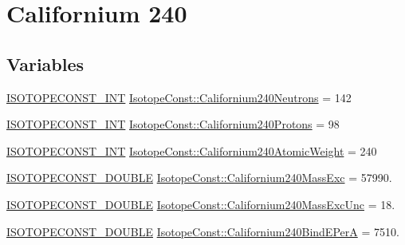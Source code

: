 \hypertarget{group___isotope_const-_californium-_cf240}{}\section{Californium 240}
\label{group___isotope_const-_californium-_cf240}
\subsection*{Variables}
\begin{DoxyCompactItemize}
\item 
\mbox{\hyperlink{group___isotope_const-_macros_ga5f18360b3e99483a35c32d789e62621c}{I\+S\+O\+T\+O\+P\+E\+C\+O\+N\+S\+T\+\_\+\+I\+NT}} \mbox{\hyperlink{group___isotope_const-_californium-_cf240_ga4916f5ae80176eed703cdb8b3a03922d}{Isotope\+Const\+::\+Californium240\+Neutrons}} = 142
\item 
\mbox{\hyperlink{group___isotope_const-_macros_ga5f18360b3e99483a35c32d789e62621c}{I\+S\+O\+T\+O\+P\+E\+C\+O\+N\+S\+T\+\_\+\+I\+NT}} \mbox{\hyperlink{group___isotope_const-_californium-_cf240_ga8d510fe42c47660cd961e486d42815f9}{Isotope\+Const\+::\+Californium240\+Protons}} = 98
\item 
\mbox{\hyperlink{group___isotope_const-_macros_ga5f18360b3e99483a35c32d789e62621c}{I\+S\+O\+T\+O\+P\+E\+C\+O\+N\+S\+T\+\_\+\+I\+NT}} \mbox{\hyperlink{group___isotope_const-_californium-_cf240_ga3d26e5f197b5d6b7f0328f293d7250d6}{Isotope\+Const\+::\+Californium240\+Atomic\+Weight}} = 240
\item 
\mbox{\hyperlink{group___isotope_const-_macros_ga8f45a7272ce02c0b4c65c44636ed719a}{I\+S\+O\+T\+O\+P\+E\+C\+O\+N\+S\+T\+\_\+\+D\+O\+U\+B\+LE}} \mbox{\hyperlink{group___isotope_const-_californium-_cf240_ga1e85418ad4928e6fb75eae97ebea9a02}{Isotope\+Const\+::\+Californium240\+Mass\+Exc}} = 57990.
\item 
\mbox{\hyperlink{group___isotope_const-_macros_ga8f45a7272ce02c0b4c65c44636ed719a}{I\+S\+O\+T\+O\+P\+E\+C\+O\+N\+S\+T\+\_\+\+D\+O\+U\+B\+LE}} \mbox{\hyperlink{group___isotope_const-_californium-_cf240_gab83c94ef18b20d25e41944f1ff8c3b27}{Isotope\+Const\+::\+Californium240\+Mass\+Exc\+Unc}} = 18.
\item 
\mbox{\hyperlink{group___isotope_const-_macros_ga8f45a7272ce02c0b4c65c44636ed719a}{I\+S\+O\+T\+O\+P\+E\+C\+O\+N\+S\+T\+\_\+\+D\+O\+U\+B\+LE}} \mbox{\hyperlink{group___isotope_const-_californium-_cf240_gaa0f408d1c7fec52b99f42c1fc4a9a5ee}{Isotope\+Const\+::\+Californium240\+Bind\+E\+PerA}} = 7510.

\end{DoxyCompactItemize}

